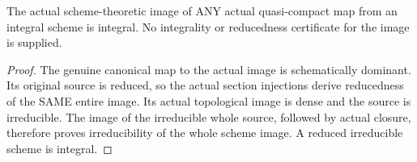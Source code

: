 \begin{theorem}
\label{scheme:integral-schematic-image}
\leanok
The actual scheme-theoretic image of ANY actual quasi-compact map from an
integral scheme is integral. No integrality or reducedness certificate for
the image is supplied.
\end{theorem}
\begin{proof}
The genuine canonical map to the actual image is schematically dominant.
Its original source is reduced, so the actual section injections derive
reducedness of the SAME entire image. Its actual topological image is dense
and the source is irreducible. The image of the irreducible whole source,
followed by actual closure, therefore proves irreducibility of the whole
scheme image. A reduced irreducible scheme is integral.
\end{proof}
